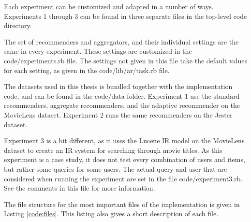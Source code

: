 Each experiment can be customized and adapted in a number of ways.
Experiments 1 through 3 can be found in three separate files
in the top-level code directory.

The set of recommenders and aggregators, and their individual settings
are the same in every experiment. 
These settings are customized in the \textsf{code/experiments.rb} file.
The settings not given in this file take the default values for each setting,
as given in the \textsf{code/lib/ar/task.rb} file.

The datasets used in this thesis is bundled together with the implementation code,
and can be found in the \textsf{code/data} folder.
Experiment 1 use the standard recommenders, aggregate recommenders,
and the adaptive recommender on the MovieLens dataset.
Experiment 2 runs the same recommenders on the Jester dataset.

Experiment 3 is a bit different, as it uses the Lucene IR model
on the MovieLens dataset to create an IR system for searching
through movie titles.
As this experiment is a case study, it does not test every combination
of users and items, but rather some queries for some users.
The actual query and user that are considered when running the 
experiment are set in the file \textsf{code/experiment3.rb}.
See the comments in this file for more information.

The file structure for the most important files of the implementation is given in Listing \ref{code:files}.
This listing also gives a short description of each file.

